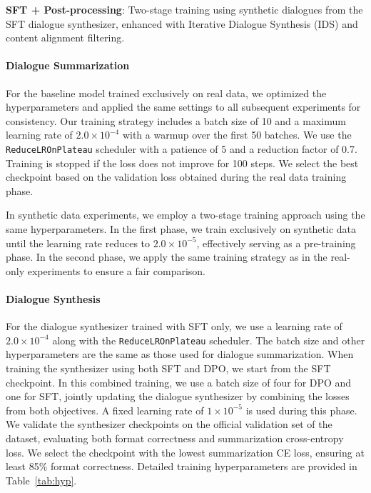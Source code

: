 \textbf{SFT + Post-processing}: Two-stage training using synthetic dialogues from the SFT dialogue synthesizer, enhanced with Iterative Dialogue Synthesis (IDS) and content alignment filtering.




\paragraph{Dialogue Summarization}
For the baseline model trained exclusively on real data, we optimized the hyperparameters and applied the same settings to all subsequent experiments for consistency. Our training strategy includes a batch size of 10 and a maximum learning rate of $2.0 \times 10^{-4}$ with a warmup over the first 50 batches. We use the \texttt{ReduceLROnPlateau} scheduler with a patience of 5 and a reduction factor of 0.7. Training is stopped if the loss does not improve for 100 steps. We select the best checkpoint based on the validation loss obtained during the real data training phase.

In synthetic data experiments, we employ a two-stage training approach using the same hyperparameters. In the first phase, we train exclusively on synthetic data until the learning rate reduces to $2.0 \times 10^{-5}$, effectively serving as a pre-training phase. In the second phase, we apply the same training strategy as in the real-only experiments to ensure a fair comparison.



\paragraph{Dialogue Synthesis}
For the dialogue synthesizer trained with SFT only, we use a learning rate of $2.0 \times 10^{-4}$ along with the \texttt{ReduceLROnPlateau} scheduler. The batch size and other hyperparameters are the same as those used for dialogue summarization. When training the synthesizer using both SFT and DPO, we start from the SFT checkpoint. In this combined training, we use a batch size of four for DPO and one for SFT, jointly updating the dialogue synthesizer by combining the losses from both objectives. A fixed learning rate of $1 \times 10^{-5}$ is used during this phase. We validate the synthesizer checkpoints on the official validation set of the dataset, evaluating both format correctness and summarization cross-entropy loss. We select the checkpoint with the lowest summarization CE loss, ensuring at least 85\% format correctness. Detailed training hyperparameters are provided in Table~\ref{tab:hyp}.


